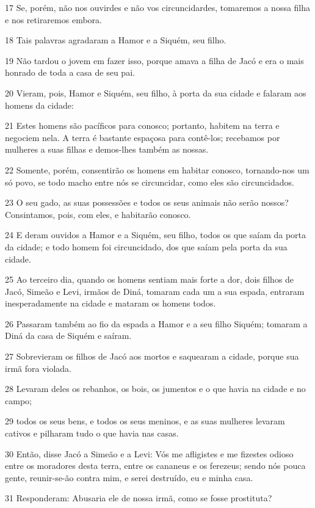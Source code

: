\par 17 Se, porém, não nos ouvirdes e não vos circuncidardes, tomaremos a nossa filha e nos retiraremos embora.
\par 18 Tais palavras agradaram a Hamor e a Siquém, seu filho.
\par 19 Não tardou o jovem em fazer isso, porque amava a filha de Jacó e era o mais honrado de toda a casa de seu pai.
\par 20 Vieram, pois, Hamor e Siquém, seu filho, à porta da sua cidade e falaram aos homens da cidade:
\par 21 Estes homens são pacíficos para conosco; portanto, habitem na terra e negociem nela. A terra é bastante espaçosa para contê-los; recebamos por mulheres a suas filhas e demos-lhes também as nossas.
\par 22 Somente, porém, consentirão os homens em habitar conosco, tornando-nos um só povo, se todo macho entre nós se circuncidar, como eles são circuncidados.
\par 23 O seu gado, as suas possessões e todos os seus animais não serão nossos? Consintamos, pois, com eles, e habitarão conosco.
\par 24 E deram ouvidos a Hamor e a Siquém, seu filho, todos os que saíam da porta da cidade; e todo homem foi circuncidado, dos que saíam pela porta da sua cidade.
\par 25 Ao terceiro dia, quando os homens sentiam mais forte a dor, dois filhos de Jacó, Simeão e Levi, irmãos de Diná, tomaram cada um a sua espada, entraram inesperadamente na cidade e mataram os homens todos.
\par 26 Passaram também ao fio da espada a Hamor e a seu filho Siquém; tomaram a Diná da casa de Siquém e saíram.
\par 27 Sobrevieram os filhos de Jacó aos mortos e saquearam a cidade, porque sua irmã fora violada.
\par 28 Levaram deles os rebanhos, os bois, os jumentos e o que havia na cidade e no campo;
\par 29 todos os seus bens, e todos os seus meninos, e as suas mulheres levaram cativos e pilharam tudo o que havia nas casas.
\par 30 Então, disse Jacó a Simeão e a Levi: Vós me afligistes e me fizestes odioso entre os moradores desta terra, entre os cananeus e os ferezeus; sendo nós pouca gente, reunir-se-ão contra mim, e serei destruído, eu e minha casa.
\par 31 Responderam: Abusaria ele de nossa irmã, como se fosse prostituta?

